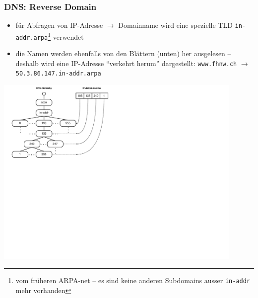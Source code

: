 \documentclass[ignorenonframetext]{beamer}
\begin{document}
\begin{frame}\label{reverse}
\frametitle{DNS: Reverse Domain}
\begin{itemize}
	\item{f\"ur Abfragen von IP-Adresse $\rightarrow$ Domainname wird eine spezielle TLD \texttt{in-addr.arpa}{}\footnote{vom fr\"uheren ARPA-net -- es sind keine anderen Subdomains ausser \texttt{in-addr} mehr vorhanden} verwendet}
	\item{die Namen werden ebenfalls von den Bl\"attern (unten) her ausgelesen -- deshalb wird eine IP-Adresse ``verkehrt herum'' dargestellt: \texttt{www.fhnw.ch} $\rightarrow$ \texttt{50.3.86.147.in-addr.arpa}}
\end{itemize}
\includegraphics[width=12cm]{dns-reversehierarchy}
\end{frame}
\end{document}
